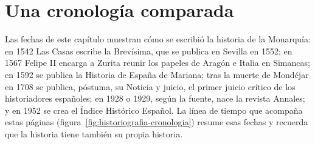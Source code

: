 \documentclass{book}
\begin{document}

\section{Una cronología comparada}

Las fechas de este capítulo muestran cómo se escribió la historia de la Monarquía: en 1542 Las Casas escribe la Brevísima, que se publica en Sevilla en 1552; en 1567 Felipe II encarga a Zurita reunir los papeles de Aragón e Italia en Simancas; en 1592 se publica la Historia de España de Mariana; tras la muerte de Mondéjar en 1708 se publica, póstuma, su Noticia y juicio, el primer juicio crítico de los historiadores españoles; en 1928 o 1929, según la fuente, nace la revista Annales; y en 1952 se crea el Índice Histórico Español. La línea de tiempo que acompaña estas páginas (figura~\ref{fig:historiografia-cronologia}) resume esas fechas y recuerda que la historia tiene también su propia historia.

\end{document}
